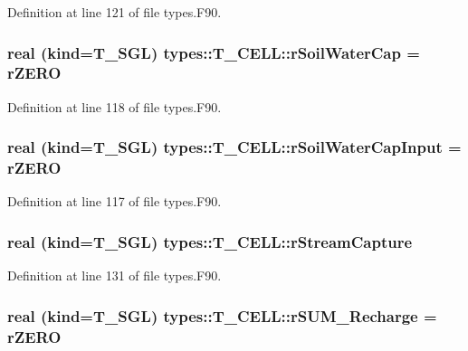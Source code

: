 Definition at line 121 of file types.F90.

\hypertarget{typetypes_1_1_t___c_e_l_l_ac7141ed7e08e282033530218c67158bc}{
\subsubsection[{rSoilWaterCap}]{\setlength{\rightskip}{0pt plus 5cm}real (kind={\bf T\_\-SGL}) {\bf types::T\_\-CELL::rSoilWaterCap} = {\bf rZERO}}}
\label{typetypes_1_1_t___c_e_l_l_ac7141ed7e08e282033530218c67158bc}


Definition at line 118 of file types.F90.

\hypertarget{typetypes_1_1_t___c_e_l_l_a86adbade264031180153cfa16455d46c}{
\subsubsection[{rSoilWaterCapInput}]{\setlength{\rightskip}{0pt plus 5cm}real (kind={\bf T\_\-SGL}) {\bf types::T\_\-CELL::rSoilWaterCapInput} = {\bf rZERO}}}
\label{typetypes_1_1_t___c_e_l_l_a86adbade264031180153cfa16455d46c}


Definition at line 117 of file types.F90.

\hypertarget{typetypes_1_1_t___c_e_l_l_aa1489c4df446c844537b8322d2b24f27}{
\subsubsection[{rStreamCapture}]{\setlength{\rightskip}{0pt plus 5cm}real (kind={\bf T\_\-SGL}) {\bf types::T\_\-CELL::rStreamCapture}}}
\label{typetypes_1_1_t___c_e_l_l_aa1489c4df446c844537b8322d2b24f27}


Definition at line 131 of file types.F90.

\hypertarget{typetypes_1_1_t___c_e_l_l_a56fead18ef4c2cb2b7a43eaf58c7ac36}{
\subsubsection[{rSUM\_\-Recharge}]{\setlength{\rightskip}{0pt plus 5cm}real (kind={\bf T\_\-SGL}) {\bf types::T\_\-CELL::rSUM\_\-Recharge} = {\bf rZERO}}}
\label{typetypes_1_1_t___c_e_l_l_a56fead18ef4c2cb2b7a43eaf58c7ac36}


